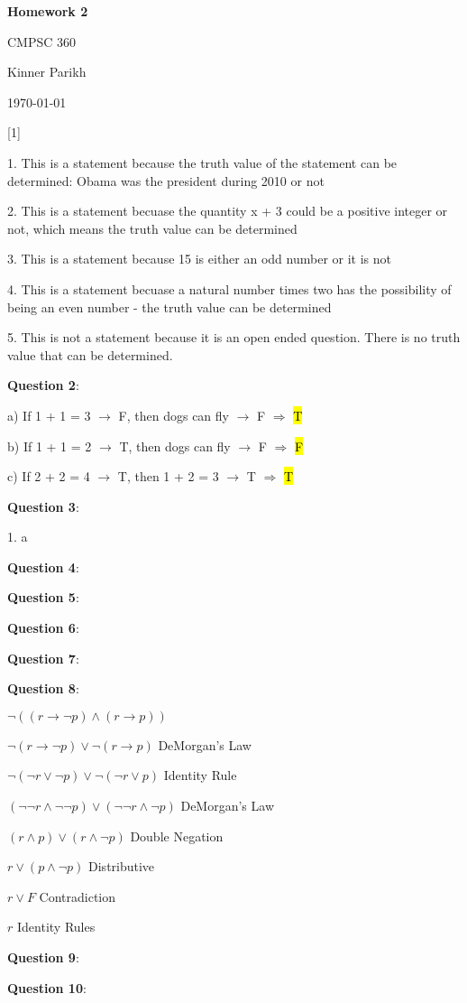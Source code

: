 \documentclass{article} %
\newcommand{\question}[2][]{\begin{flushleft}
        \textbf{Question #1}: \textit{#2}

\end{flushleft}}
\newcommand{\maketitletwo}[2][]{\begin{center}
        \Large{\textbf{Homework #1}
            
            CMPSC 360} %
        \vspace{5pt}
        
        \normalsize{Kinner Parikh  %
        
        \today}        %
        \vspace{15pt}
        
\end{center}}
\begin{document}
    \maketitletwo[2]  %
    
    \question[1]{}
    
    1. This is a statement because the truth value of the statement can be determined: Obama was \tabto{1cm} the president during 2010 or not

    2. This is a statement becuase the quantity x + 3 could be a positive integer or not, which \tabto{1cm} means the truth value can be determined

    3. This is a statement because 15 is either an odd number or it is not

    4. This is a statement becuase a natural number times two has the possibility of being an even \tabto{1cm} number - the truth value can be determined

    5. This is not a statement because it is an open ended question. There is no truth value that \tabto{1cm} can be determined.

    \question[2]{}

    a) If 1 + 1 = 3 $\rightarrow$ F, then dogs can fly $\rightarrow$ F $\Rightarrow$  \hl{T}

    b) If 1 + 1 = 2 $\rightarrow$ T, then dogs can fly $\rightarrow$ F $\Rightarrow$  \hl{F}

    c) If 2 + 2 = 4 $\rightarrow$ T, then 1 + 2 = 3 $\rightarrow$ T $\Rightarrow$  \hl{T}

    \question[3]{}

    1. a 
    
    \question[4]{}

    \question[5]{}

    \question[6]{}

    \question[7]{}

    \question[8]{}

    $\neg ((r \rightarrow \neg p) \land (r \rightarrow p))$

    $\neg(r \rightarrow \neg p) \lor \neg(r \rightarrow p) $ \tabto*{5cm} DeMorgan's Law

    $\neg(\neg r \lor \neg p) \lor \neg( \neg r \lor p) $ \tabto*{5cm} Identity Rule

    $(\neg \neg r \land \neg \neg p) \lor (\neg \neg r \land \neg p) $ \tabto*{5cm} DeMorgan's Law

    $(r \land p) \lor (r \land \neg p)$ \tabto*{5cm} Double Negation \hspace*{2cm}

    $r \lor (p \land \neg p)$ \tabto*{5cm} Distributive
    
    $r \lor F$ \tabto*{5cm} Contradiction
    
    $r$ \tabto*{5cm} Identity Rules

    \question[9]{}

    

    \question[10]{}
\end{document}
